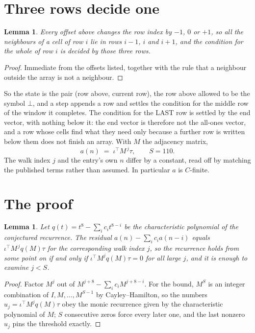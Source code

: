 \documentclass[11pt,a4paper]{article}
\theoremstyle{plain}
\newtheorem{lemma}[theorem]{Lemma}
\theoremstyle{definition}
\begin{document}
\section{Three rows decide one}

\begin{lemma}\label{lem:win}
Every offset above changes the row index by $-1$, $0$ or $+1$, so all the neighbours of a cell
of row $i$ lie in rows $i-1$, $i$ and $i+1$, and the condition for the whole of row $i$ is
decided by those three rows.
\end{lemma}

\begin{proof}
Immediate from the offsets listed, together with the rule that a neighbour outside the array is
not a neighbour.
\end{proof}

So the state is the pair (row above, current row), the row above allowed to be the symbol
$\bot$, and a step appends a row and settles the condition for the middle row of the window it
completes. The condition for the LAST row is settled by the end vector, with nothing below it:
the end vector is therefore not the all-ones vector, and a row whose cells find what they need
only because a further row is written below them does not finish an array. With $M$ the
adjacency matrix,
\[
a(n)\;=\;\iota^{\!\top}M^{\,j}\tau ,\qquad S=110.
\]
The walk index $j$ and the entry's own $n$ differ by a constant, read off by matching the
published terms rather than assumed. In particular $a$ is $C$-finite.

\section{The proof}

\begin{lemma}\label{lem:crit}
Let $q(t)=t^{8}-\sum_i c_it^{8-i}$ be the characteristic polynomial of the
conjectured recurrence. The residual $a(n)-\sum_ic_ia(n-i)$ equals
$\iota^{\!\top}M^{\,j}q(M)\tau$ for the corresponding walk index $j$, so the recurrence
holds from some point on if and only if $\iota^{\!\top}M^{j}q(M)\tau=0$ for all large $j$,
and it is enough to examine $j<S$.
\end{lemma}

\begin{proof}
Factor $M^{j}$ out of $M^{j+8}-\sum_ic_iM^{j+8-i}$. For the bound, $M^{S}$
is an integer combination of $I,M,\dots,M^{S-1}$ by Cayley--Hamilton, so the numbers
$u_j=\iota^{\!\top}M^{j}q(M)\tau$ obey the monic recurrence given by the characteristic
polynomial of $M$; $S$ consecutive zeros force every later one, and the last nonzero $u_j$
pins the threshold exactly.
\end{proof}
\end{document}
